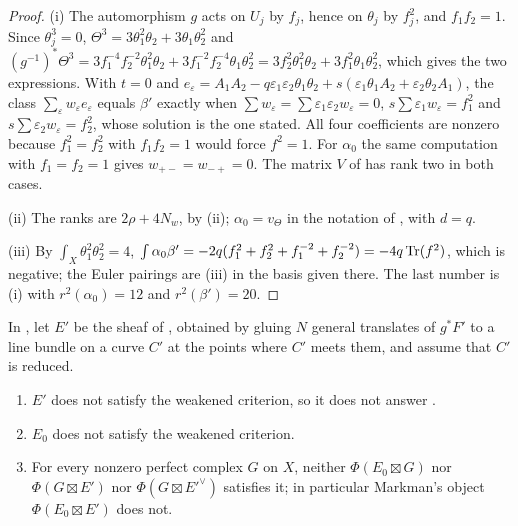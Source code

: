 \begin{proof}
(i) The automorphism $g$ acts on $U_{j}$ by $f_{j}$, hence on $\theta_{j}$ by
$f_{j}^{2}$, and $f_{1}f_{2}=1$. Since $\theta_{j}^{3}=0$,
$\Theta^{3}=3\theta_{1}^{2}\theta_{2}+3\theta_{1}\theta_{2}^{2}$ and
$(g^{-1})^{*}\Theta^{3}=3f_{1}^{-4}f_{2}^{-2}\theta_{1}^{2}\theta_{2}
+3f_{1}^{-2}f_{2}^{-4}\theta_{1}\theta_{2}^{2}
=3f_{2}^{2}\theta_{1}^{2}\theta_{2}+3f_{1}^{2}\theta_{1}\theta_{2}^{2}$, which
gives the two expressions. With $t=0$ and
$e_{\varepsilon}=A_{1}A_{2}-q\varepsilon_{1}\varepsilon_{2}\theta_{1}\theta_{2}
+s(\varepsilon_{1}\theta_{1}A_{2}+\varepsilon_{2}\theta_{2}A_{1})$, the class
$\sum_{\varepsilon}w_{\varepsilon}e_{\varepsilon}$ equals $\beta'$ exactly when
$\sum w_{\varepsilon}=\sum\varepsilon_{1}\varepsilon_{2}w_{\varepsilon}=0$,
$s\sum\varepsilon_{1}w_{\varepsilon}=f_{1}^{2}$ and
$s\sum\varepsilon_{2}w_{\varepsilon}=f_{2}^{2}$, whose solution is the one
stated. All four coefficients are nonzero because $f_{1}^{2}=f_{2}^{2}$ with
$f_{1}f_{2}=1$ would force $f^{2}=1$. For $\alpha_{0}$ the same computation
with $f_{1}=f_{2}=1$ gives $w_{+-}=w_{-+}=0$. The matrix $V$ of
 has rank two in both cases.

(ii) The ranks are $2\rho+4N_{w}$, by (ii);
$\alpha_{0}=v_{\Theta}$ in the notation of \cite[(30)]{paperI}, with $d=q$.

(iii) By $\int_{X}\theta_{1}^{2}\theta_{2}^{2}=4$,
$\int\alpha_{0}\beta'=-2q(f_{1}^{2}+f_{2}^{2}+f_{1}^{-2}+f_{2}^{-2})=-4q\operatorname{Tr}(f^{2})$,
which is negative; the Euler pairings are
(iii) in the basis given there. The last number is
(i) with $r^{2}(\alpha_{0})=12$ and
$r^{2}(\beta')=20$.
\end{proof}

\begin{corollary}\label{cor:markmanquarticfails}
In , let $E'$ be the sheaf of
\cite[Example~11.2.7]{Mar25c}, obtained by gluing $N$ general translates of
$g^{*}F'$ to a line bundle on a curve $C'$ at the points where $C'$ meets
them, and assume that $C'$ is reduced.
\begin{enumerate}[label=\textup{(\roman*)},leftmargin=2.6em,itemsep=2pt]
\item $E'$ does not satisfy the weakened criterion, so it does not answer
  \cite[Question~11.2.2]{Mar25c}.
\item $E_{0}$ does not satisfy the weakened criterion.
\item For every nonzero perfect complex $G$ on $X$, neither
  $\Phi(E_{0}\boxtimes G)$ nor $\Phi(G\boxtimes E')$ nor
  $\Phi(G\boxtimes E'^{\vee})$ satisfies it; in particular Markman's object
  $\Phi(E_{0}\boxtimes E')$ does not.
\end{enumerate}
\end{corollary}

